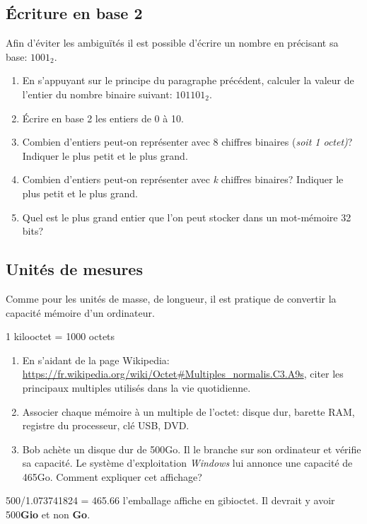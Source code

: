 \documentclass[a4paper,11pt]{article}
\begin{document}
\begin{Form}
\subsection{Écriture en base 2}
Afin d'éviter les ambiguïtés il est possible d'écrire un nombre en précisant sa base: $1001_2$.
\begin{activite}
\begin{enumerate}
\item En s'appuyant sur le principe du paragraphe précédent, calculer la valeur de l'entier du nombre binaire suivant: $101101_2$.
\item Écrire en base 2 les entiers de 0 à 10.
\item Combien d'entiers peut-on représenter avec 8 chiffres binaires (\emph{soit 1 octet)}? Indiquer le plus petit et le plus grand.
\item Combien d'entiers peut-on représenter avec \emph{k} chiffres binaires? Indiquer le plus petit et le plus grand.
\item Quel est le plus grand entier que l'on peut stocker dans un mot-mémoire 32 bits?
\end{enumerate}
\end{activite}
\subsection{Unités de mesures}
Comme pour les unités de masse, de longueur, il est pratique de convertir la capacité mémoire d'un ordinateur.
\begin{center}
1 kilooctet = 1000 octets
\end{center}
\begin{activite}
\begin{enumerate}
\item En s'aidant de la page Wikipedia: \url{https://fr.wikipedia.org/wiki/Octet#Multiples_normalis.C3.A9s}, citer les principaux multiples utilisés dans la vie quotidienne.
\item Associer chaque mémoire à un multiple de l'octet: disque dur, barette RAM, registre du processeur, clé USB, DVD.
\item Bob achète un disque dur de 500Go. Il le branche sur son ordinateur et vérifie sa capacité. Le système d'exploitation \emph{Windows} lui annonce une capacité de 465Go. Comment expliquer cet affichage?
\end{enumerate}
\end{activite}
\begin{commentprof}
500/1.073741824 = 465.66 l'emballage affiche en gibioctet. Il devrait y avoir 500\textbf{Gio} et non \textbf{Go}.
\end{commentprof}

\end{Form}
\end{document}
